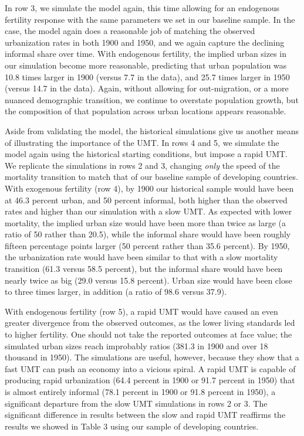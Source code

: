\documentclass[10pt]{article}
\begin{document}
In row 3, we simulate the model again, this time allowing for an endogenous fertility response with the same parameters we set in our baseline sample. In the case, the model again does a reasonable job of matching the observed urbanization rates in both 1900 and 1950, and we again capture the declining informal share over time. With endogenous fertility, the implied urban sizes in our simulation become more reasonable, predicting that urban population was 10.8 times larger in 1900 (versus 7.7 in the data), and 25.7 times larger in 1950 (versus 14.7 in the data). Again, without allowing for out-migration, or a more nuanced demographic transition, we continue to overstate population growth, but the composition of that population across urban locations appears reasonable. 

Aside from validating the model, the historical simulations give us another means of illustrating the importance of the UMT. In rows 4 and 5, we simulate the model again using the historical starting conditions, but impose a rapid UMT. We replicate the simulations in rows 2 and 3, changing \textit{only} the speed of the mortality transition to match that of our baseline sample of developing countries. With exogenous fertility (row 4), by 1900 our historical sample would have been at 46.3 percent urban, and 50 percent informal, both higher than the observed rates and higher than our simulation with a slow UMT. As expected with lower mortality, the implied urban size would have been more than twice as large (a ratio of 50 rather than 20.5), while the informal share would have been roughly fifteen percentage points larger (50 percent rather than 35.6 percent). By 1950, the urbanization rate would have been similar to that with a slow mortality transition (61.3 versus 58.5 percent), but the informal share would have been nearly twice as big (29.0 versus 15.8 percent). Urban size would have been close to three times larger, in addition (a ratio of 98.6 versus 37.9). 

With endogenous fertility (row 5), a rapid UMT would have caused an even greater divergence from the observed outcomes, as the lower living standards led to higher fertility. One should not take the reported outcomes at face value; the simulated urban sizes reach improbably ratios (381.3 in 1900 and over 18 thousand in 1950). The simulations are useful, however, because they show that a fast UMT can push an economy into a vicious spiral. A rapid UMT is capable of producing rapid urbanization (64.4 percent in 1900 or 91.7 percent in 1950) that is almost entirely informal (78.1 percent in 1900 or 91.8 percent in 1950), a significant departure from the slow UMT simulations in rows 2 or 3. The significant difference in results between the slow and rapid UMT reaffirms the results we showed in Table 3 using our sample of developing countries.
\end{document}
